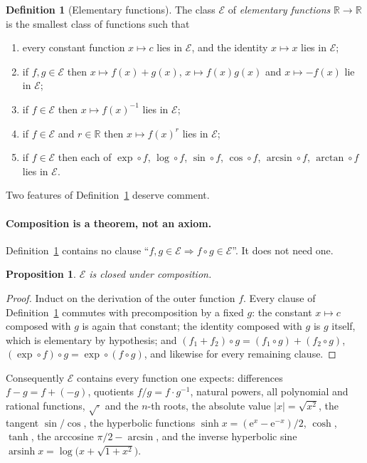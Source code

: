 \documentclass[11pt,oneside]{article}
\newtheorem{proposition}[theorem]{Proposition}
\theoremstyle{definition}
\newtheorem{definition}[theorem]{Definition}
\theoremstyle{remark}
\newcommand{\R}{\mathbb R}
\newcommand{\e}{\mathrm e}
\newcommand{\Elem}{\mathcal E}
\begin{document}
\begin{definition}[Elementary functions]\label{def:elem}
The class $\Elem$ of \emph{elementary functions} $\R\to\R$ is the smallest
class of functions such that
\begin{enumerate}
\item every constant function $x\mapsto c$ lies in $\Elem$, and the identity
      $x\mapsto x$ lies in $\Elem$;
\item if $f,g\in\Elem$ then $x\mapsto f(x)+g(x)$, $x\mapsto f(x)g(x)$ and
      $x\mapsto -f(x)$ lie in $\Elem$;
\item if $f\in\Elem$ then $x\mapsto f(x)^{-1}$ lies in $\Elem$;
\item if $f\in\Elem$ and $r\in\R$ then $x\mapsto f(x)^r$ lies in $\Elem$;
\item if $f\in\Elem$ then each of
      $\exp\circ f$, $\log\circ f$, $\sin\circ f$, $\cos\circ f$,
      $\arcsin\circ f$, $\arctan\circ f$ lies in $\Elem$.
\end{enumerate}
\end{definition}

Two features of Definition~\ref{def:elem} deserve comment.

\paragraph{Composition is a theorem, not an axiom.}
Definition~\ref{def:elem} contains no clause ``$f,g\in\Elem\Rightarrow f\circ
g\in\Elem$''.  It does not need one.

\begin{proposition}\label{prop:comp}
$\Elem$ is closed under composition.
\end{proposition}

\begin{proof}
Induct on the derivation of the outer function $f$.  Every clause of
Definition~\ref{def:elem} commutes with precomposition by a fixed $g$: the constant
$x\mapsto c$ composed with $g$ is again that constant; the identity composed
with $g$ is $g$ itself, which is elementary by hypothesis; and
$(f_1+f_2)\circ g=(f_1\circ g)+(f_2\circ g)$, $(\exp\circ f)\circ
g=\exp\circ(f\circ g)$, and likewise for every remaining clause.
\end{proof}

Consequently $\Elem$ contains every function one expects: differences
$f-g=f+(-g)$, quotients $f/g=f\cdot g^{-1}$, natural powers, all polynomial
and rational functions, $\sqrt{\cdot}$ and the $n$-th roots,
the absolute value $|x|=\sqrt{x^2}$, the tangent $\sin/\cos$, the hyperbolic
functions $\sinh x=(\e^x-\e^{-x})/2$, $\cosh$, $\tanh$, the arccosine
$\pi/2-\arcsin$, and the inverse hyperbolic sine
$\operatorname{arsinh}x=\log\bigl(x+\sqrt{1+x^2}\bigr)$.
\end{document}
